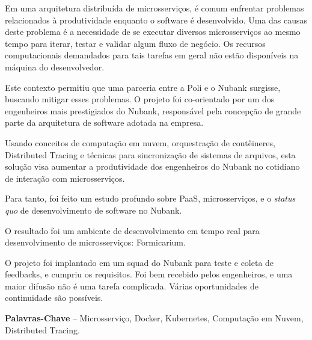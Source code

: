 \begin{resumo}
	Em uma arquitetura distribuída de microsserviços, é comum enfrentar problemas relacionados à produtividade enquanto o software é desenvolvido. Uma das causas deste problema é a necessidade de se executar diversos microsserviços ao mesmo tempo para iterar, testar e validar algum fluxo de negócio. Os recursos computacionais demandados para tais tarefas em geral não estão disponíveis na máquina do desenvolvedor.
	
	Este contexto permitiu que uma parceria entre a Poli e o Nubank surgisse, buscando mitigar esses problemas. O projeto foi co-orientado por um dos engenheiros mais prestigiados do Nubank, responsável pela concepção de grande parte da arquitetura de software adotada na empresa.
	
	
	Usando conceitos de computação em nuvem, orquestração de contêineres, Distributed Tracing e técnicas para sincronização de sistemas de arquivos, esta solução visa aumentar a produtividade dos engenheiros do Nubank no cotidiano de interação com microsserviços.
	
	Para tanto, foi feito um estudo profundo sobre PaaS, microsserviços, e o \textit{status quo} de desenvolvimento de software no Nubank. 
	
	O resultado foi um ambiente de desenvolvimento em tempo real para desenvolvimento de microsserviços: Formicarium.
	
	O projeto foi implantado em um squad do Nubank para teste e coleta de feedbacks, e cumpriu os requisitos. Foi bem recebido pelos engenheiros, e uma maior difusão não é uma tarefa complicada. Várias oportunidades de continuidade são possíveis.
	
%
%
\textbf{Palavras-Chave} -- Microsserviço, Docker, Kubernetes, Computação em Nuvem, Distributed Tracing.
\end{resumo}
